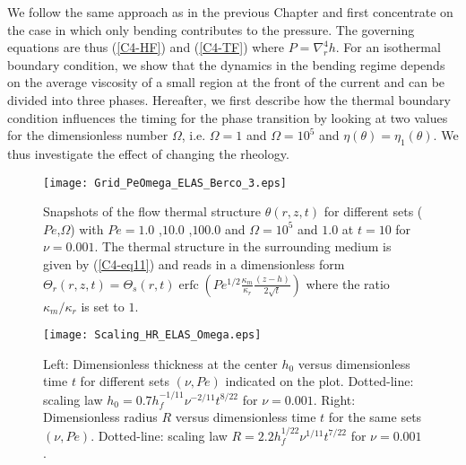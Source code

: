 We  follow the  same approach  as in  the previous  Chapter and  first
concentrate  on the  case in  which  only bending  contributes to  the
pressure.   The   governing  equations  are  thus   (\ref{C4-HF})  and
(\ref{C4-TF})  where $P  = \nabla_r^4h$.   For an  isothermal boundary
condition, we show that the dynamics  in the bending regime depends on
the average  viscosity of a small  region at the front  of the current
and can be divided into three phases. Hereafter, we first describe how
the thermal  boundary condition  influences the  timing for  the phase
transition  by looking  at  two values  for  the dimensionless  number
$\Omega$,     i.e.       $\Omega=1$     and      $\Omega=10^5$     and
$\eta(\theta)=\eta_1(\theta)$.   We  thus  investigate the  effect  of
changing the rheology.

\begin{figure}[htpb]
  \begin{center}
    \graphicspath{ {/Users/thorey/Documents/These/Projet/Refroidissement/Skin_Model/Figure/Figure_Heating/} }
    \texttt{[image: Grid\_PeOmega\_ELAS\_Berco\_3.eps]}
    \caption{Snapshots of  the flow thermal  structure $\theta(r,z,t)$
      for  different  sets  ($Pe$,$\Omega$)  with  $Pe=  1.0$  ,$10.0$
      ,$100.0$   and   $\Omega=10^5$   and   $1.0$   at   $t=10$   for
      $\nu=0.001$. The thermal structure  in the surrounding medium is
      given  by  (\ref{C4-eq11}) and  reads  in  a dimensionless  form
      $\Theta_r(r,z,t)=\Theta_s(r,t)\operatorname{erfc}{\left(Pe^{1/2}\frac{\kappa_m}{\kappa_r}\frac{(z-h)}{2\sqrt{t}}\right)}$
      where the ratio $\kappa_m/\kappa_r$ is set to $1$.}
    \label{C4-Grid_PeOmega_Heating}
  \end{center}
\end{figure}

\begin{figure}[htpb]
  \begin{center}
    \graphicspath{ {/Users/thorey/Documents/These/Projet/Refroidissement/Skin_Model/Figure/Figure_Heating/} }
    \texttt{[image: Scaling\_HR\_ELAS\_Omega.eps]}
    \caption{Left: Dimensionless thickness at  the center $h_0$ versus
      dimensionless time  $t$ for different sets  $(\nu,Pe)$ indicated
      on      the      plot.        Dotted-line:      scaling      law
      $h_0=   0.7h_f^{-1/11}\nu^{-2/11}t^{8/22}$    for   $\nu=0.001$.
      Right: Dimensionless  radius $R$  versus dimensionless  time $t$
      for  the   same  sets  $(\nu,Pe)$.   Dotted-line:   scaling  law
      $R= 2.2h_f^{1/22}\nu^{1/11}t^{7/22}$ for $\nu = 0.001$.}
    \label{C4-Scaling_HR_ELAS_Omega}
  \end{center}
\end{figure}
